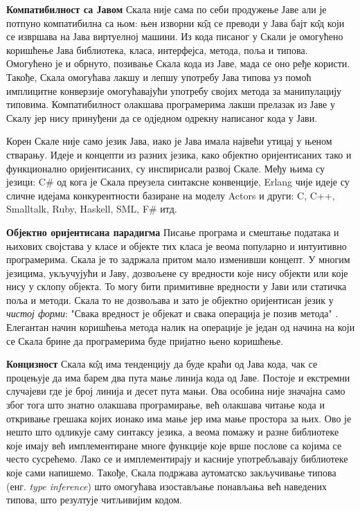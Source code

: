 \documentclass[12pt,oneside]{memoir}
\begin{document}
\begin{description}
\item \textbf{Компатибилност са Јавом} Скала није сама по себи продужење Јаве али је потпуно компатибилна са њом: њен изворни к\^{о}д се преводи у Јава бајт к\^{о}д који се извршава на Јава виртуелној машини. Из кода писаног у Скали је омогућено коришћење Јава библиотека, класа, интерфејса, метода, поља и типова. Омогућено је и обрнуто, позивање Скала кода из Јаве, мада се оно ређе користи. Такође, Скала омогућава лакшу и лепшу употребу Јава типова уз помоћ имплицитне конверзије омогућавајући употребу својих метода за манипулацију типовима. Компатибилност олакшава програмерима лакши прелазак из Јаве у Скалу јер нису принуђени да се одједном одрекну написаног кода у Јави.

Корен Скале није само језик Јава, иако је Јава имала највећи утицај у њеном стварању. Идеје и концепти из разних језика, како објектно оријентисаних тако и функционално оријентисаних, су инспирисали развој Скале. Међу њима су језици: C\#  од кога је Скала преузела синтаксне конвенције, Erlang чије идеје су сличне идејама конкурентности базиране на моделу Actors и други: C, C++,  Smalltalk, Ruby, Haskell, SML, F\# итд.

\item \textbf{Објектно оријентисана парадигма} Писање програма и смештање података и њихових својстава у класе и објекте тих класа је веома популарно и интуитивно програмерима. Скала је то задржала притом мало изменивши концепт. У многим језицима, укључујући и Јаву, дозвољене су вредности  које нису објекти или које нису у склопу објекта. То могу бити примитивне вредности у Јави или статичка поља и методи. Скала то не дозвољава и зато је објектно оријентисан језик у \textit{чистој форми}: "Свака вредност је објекат и свака операција је позив метода" \cite{progInScala}. Елегантан начин коришћења метода налик на операције је један од начина на који се Скала брине да програмерима буде пријатно њено коришћење.

\item \textbf{Концизност} Скала к\^{о}д има тенденцију да буде краћи од Јава кода, чак се процењује да има барем два пута мање линија кода од Јаве. Постоје и екстремни случајеви где је број линија и десет пута мањи. Ова особина није значајна само због тога што знатно олакшава програмирање, већ олакшава читање кода и откривање грешака којих ионако има мање јер има мање простора за њих. Ово је нешто што одликује саму синтаксу језика, а веома помажу и разне библиотеке које имају већ имплементиране многе функције које врше послове са којима се често сусрећемо. Лако се и имплементирају и касније употребљавају библиотеке које сами напишемо. Такође, Скала подржава аутоматско закључивање типова (енг. \textit{type inference}) што омогућава изостављање понављања већ наведених типова, што резултује читљивијим кодом.


\end{description}
\end{document}

